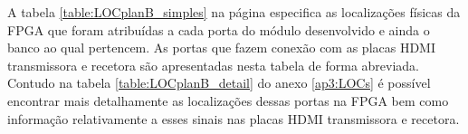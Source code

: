 A tabela \ref{table:LOCplanB_simples} na página \pageref{table:LOCplanB_simples} especifica as localizações físicas da FPGA que foram atribuídas a cada porta do módulo desenvolvido e ainda o banco ao qual pertencem. As portas que fazem conexão com as placas HDMI transmissora e recetora são apresentadas nesta tabela de forma abreviada. Contudo na tabela \ref{table:LOCplanB_detail} do anexo \ref{ap3:LOCs} é possível encontrar mais detalhamente as localizações dessas portas na FPGA bem como informação relativamente a esses sinais nas placas HDMI transmissora e recetora.



